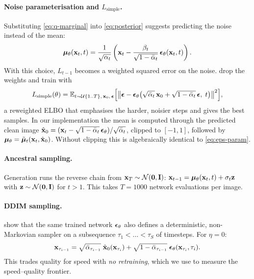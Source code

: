 \paragraph{Noise parameterisation and $L_{\text{simple}}$.} Substituting \cref{eq:q-marginal} into
\cref{eq:posterior} suggests predicting the noise instead of the mean:
\begin{equation}
  \bm{\mu}_\theta(\mathbf{x}_t,t) = \frac{1}{\sqrt{\alpha_t}}\left(\mathbf{x}_t - \frac{\beta_t}{\sqrt{1-\bar{\alpha}_t}}\,\bm{\epsilon}_\theta(\mathbf{x}_t,t)\right).
  \label{eq:eps-param}
\end{equation}
With this choice, $L_{t-1}$ becomes a weighted squared error on the noise. \citet{ho2020ddpm} drop the weights and
train with
\begin{equation}
  L_{\text{simple}}(\theta) = \mathbb{E}_{t\sim\mathcal{U}\{1..T\},\,\mathbf{x}_0,\,\bm{\epsilon}}
  \Big[\big\|\bm{\epsilon} - \bm{\epsilon}_\theta\big(\sqrt{\bar{\alpha}_t}\,\mathbf{x}_0+\sqrt{1-\bar{\alpha}_t}\,\bm{\epsilon},\; t\big)\big\|^2\Big],
  \label{eq:lsimple}
\end{equation}
a reweighted ELBO that emphasises the harder, noisier steps and gives the best samples. In our implementation the
mean is computed through the predicted clean image
$\hat{\mathbf{x}}_0=(\mathbf{x}_t-\sqrt{1-\bar{\alpha}_t}\,\bm{\epsilon}_\theta)/\sqrt{\bar{\alpha}_t}$, clipped to $[-1,1]$, followed by
$\bm{\mu}_\theta=\tilde{\bm{\mu}}_t(\mathbf{x}_t,\hat{\mathbf{x}}_0)$. Without clipping this is algebraically identical to \cref{eq:eps-param}.

\paragraph{Ancestral sampling.} Generation runs the reverse chain from $\mathbf{x}_T\sim\mathcal{N}(\mathbf{0},\mathbf{I})$:
$\mathbf{x}_{t-1} = \bm{\mu}_\theta(\mathbf{x}_t,t) + \sigma_t\mathbf{z}$ with $\mathbf{z}\sim\mathcal{N}(\mathbf{0},\mathbf{I})$ for $t>1$. This
takes $T=1000$ network evaluations per image.

\paragraph{DDIM sampling.} \citet{song2021ddim} show that the same trained network $\bm{\epsilon}_\theta$ also defines a
deterministic, non-Markovian sampler on a subsequence $\tau_1<\dots<\tau_S$ of timesteps. For $\eta=0$:
\begin{equation}
  \mathbf{x}_{\tau_{i-1}} = \sqrt{\bar{\alpha}_{\tau_{i-1}}}\;\hat{\mathbf{x}}_0(\mathbf{x}_{\tau_i})
  + \sqrt{1-\bar{\alpha}_{\tau_{i-1}}}\;\bm{\epsilon}_\theta(\mathbf{x}_{\tau_i},\tau_i).
  \label{eq:ddim}
\end{equation}
This trades quality for speed with \emph{no retraining}, which we use to measure the speed--quality frontier.

